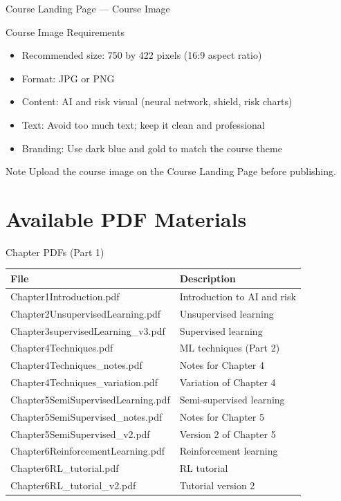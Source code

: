 \documentclass[aspectratio=169,11pt]{beamer}
\begin{document}
	\begin{frame}{Course Landing Page --- Course Image}
		\begin{block}{Course Image Requirements}
			\begin{itemize}
				\item Recommended size: 750 by 422 pixels (16:9 aspect ratio)
				\item Format: JPG or PNG
				\item Content: AI and risk visual (neural network, shield, risk charts)
				\item Text: Avoid too much text; keep it clean and professional
				\item Branding: Use dark blue and gold to match the course theme
			\end{itemize}
		\end{block}
		\begin{block}{Note}
			Upload the course image on the Course Landing Page before publishing.
		\end{block}
	\end{frame}
	
	\section{Available PDF Materials}
	
	\begin{frame}{Chapter PDFs (Part 1)}
		\small
		\centering
		\begin{tabular}{@{}p{}p{}@{}}
			\toprule
			File & Description \\
			\midrule
			Chapter1Introduction.pdf & Introduction to AI and risk \\
			Chapter2UnsupervisedLearning.pdf & Unsupervised learning \\
			Chapter3supervisedLearning\_v3.pdf & Supervised learning \\
			Chapter4Techniques.pdf & ML techniques (Part 2) \\
			Chapter4Techniques\_notes.pdf & Notes for Chapter 4 \\
			Chapter4Techniques\_variation.pdf & Variation of Chapter 4 \\
			Chapter5SemiSupervisedLearning.pdf & Semi-supervised learning \\
			Chapter5SemiSupervised\_notes.pdf & Notes for Chapter 5 \\
			Chapter5SemiSupervised\_v2.pdf & Version 2 of Chapter 5 \\
			Chapter6ReinforcementLearning.pdf & Reinforcement learning \\
			Chapter6RL\_tutorial.pdf & RL tutorial \\
			Chapter6RL\_tutorial\_v2.pdf & Tutorial version 2 \\
			\bottomrule
		\end{tabular}
	\end{frame}
	
\end{document}
